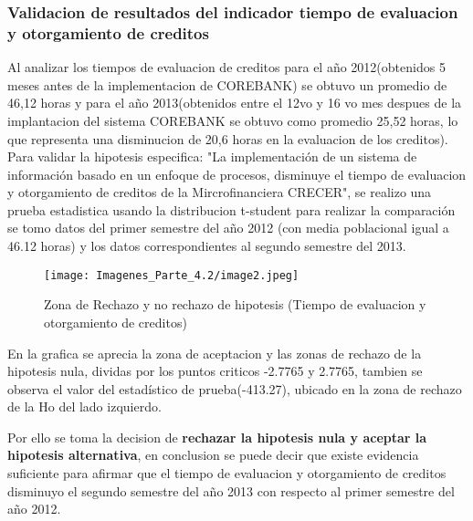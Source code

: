 \documentclass[12 pt, letterpaper]{article}
\begin{document}
\subsubsection{Validacion de resultados del indicador tiempo de evaluacion y otorgamiento de creditos}
Al analizar los tiempos de evaluacion de creditos para el año 2012(obtenidos 5 meses antes de la implementacion de COREBANK) se obtuvo un promedio de 46,12 horas y para el año 2013(obtenidos entre el 12vo y 16 vo mes despues de la implantacion del sistema COREBANK se obtuvo como promedio 25,52 horas, lo que representa una disminucion de 20,6 horas en la evaluacion de los creditos).
Para validar la hipotesis especifica: "La implementación de un sistema de información basado en un enfoque de procesos, disminuye el tiempo de evaluacion y otorgamiento de creditos de la Mircrofinanciera CRECER", se realizo una prueba estadistica usando la distribucion t-student para realizar la comparación se tomo datos del primer semestre del año 2012 (con media poblacional igual a 46.12 horas) y los datos correspondientes al segundo semestre del 2013.

\begin{figure}[H]
    \texttt{[image: Imagenes\_Parte\_4.2/image2.jpeg]}
    \caption{Zona de Rechazo y no rechazo de hipotesis (Tiempo de evaluacion y otorgamiento de creditos)}
\end{figure}

En la grafica se aprecia la zona de aceptacion y las zonas de rechazo de la hipotesis nula, dividas por los puntos criticos -2.7765 y 2.7765, tambien se observa el valor del estadístico de prueba(-413.27), ubicado en la zona de rechazo de la Ho del lado izquierdo.

Por ello se toma la decision de \textbf{rechazar la hipotesis nula y aceptar la hipotesis alternativa}, en conclusion se puede decir que existe evidencia suficiente para afirmar que el tiempo de evaluacion y otorgamiento de creditos disminuyo el segundo semestre del año 2013 con respecto al primer semestre del año 2012.
\end{document}
